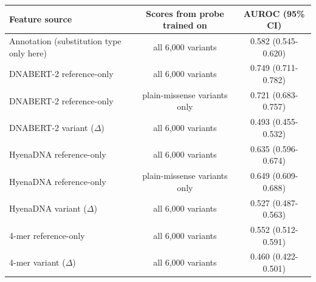 \begin{tabular}{lcc}\toprule
Feature source & Scores from probe trained on & AUROC (95\% CI)\\\midrule
Annotation (substitution type only here) & all 6,000 variants & 0.582 (0.545-0.620)\\
DNABERT-2 reference-only & all 6,000 variants & 0.749 (0.711-0.782)\\
DNABERT-2 reference-only & plain-missense variants only & 0.721 (0.683-0.757)\\
DNABERT-2 variant ($\Delta$) & all 6,000 variants & 0.493 (0.455-0.532)\\
HyenaDNA reference-only & all 6,000 variants & 0.635 (0.596-0.674)\\
HyenaDNA reference-only & plain-missense variants only & 0.649 (0.609-0.688)\\
HyenaDNA variant ($\Delta$) & all 6,000 variants & 0.527 (0.487-0.563)\\
4-mer reference-only & all 6,000 variants & 0.552 (0.512-0.591)\\
4-mer variant ($\Delta$) & all 6,000 variants & 0.460 (0.422-0.501)\\
\bottomrule\end{tabular}
